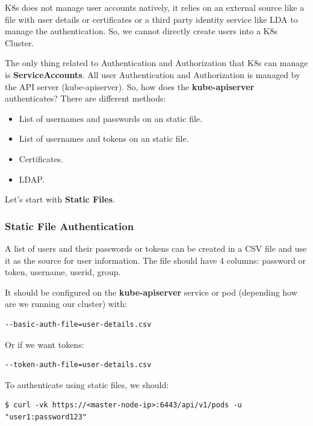 \documentclass{article}
\newenvironment{codetemplate}[1][]{%
  \mybasecolorbox[#1]
  \itshape
}{%
  \endmybasecolorbox
}
\begin{document}
K8s does not manage user accounts natively, it relies on an external source like a file with user details or certificates or a third party identity service like LDA to manage the authentication. So, we cannot directly create users into a K8s Cluster.

The only thing related to Authentication and Authorization that K8s can manage is \textbf{ServiceAccounts}. All user Authentication and Authorization is managed by the API server (kube-apiserver). So, how does the \textbf{kube-apiserver} authenticates? There are different methods:

\begin{itemize}
    \item List of usernames and passwords on an static file.
    \item List of usernames and tokens on an static file.
    \item Certificates.
    \item LDAP.
\end{itemize}

Let's start with \textbf{Static Files}.

\subsubsection{Static File Authentication}
A list of users and their passwords or tokens can be created in a CSV file and use it as the source for user information.
The file should have 4 columns: password or token, username, userid, group.

It should be configured on the \textbf{kube-apiserver} service or pod (depending how are we running our cluster) with:
\begin{codetemplate}{}
\begin{verbatim}
--basic-auth-file=user-details.csv
\end{verbatim}
\end{codetemplate}

Or if we want tokens:
\begin{codetemplate}{}
\begin{verbatim}
--token-auth-file=user-details.csv
\end{verbatim}
\end{codetemplate}

To authenticate using static files, we should:
\begin{codetemplate}{}
\begin{verbatim}
$ curl -vk https://<master-node-ip>:6443/api/v1/pods -u "user1:password123"
\end{verbatim}
\end{codetemplate}
\end{document}
